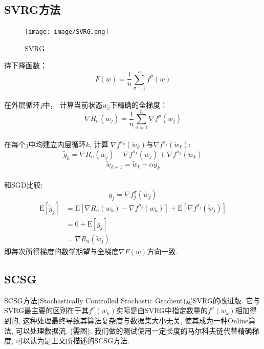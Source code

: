 \documentclass{article}
\newcommand{\E}[1]{\mathrm{E}\left[#1\right]}
\begin{document}
\subsection*{SVRG方法}
\begin{figure}[h]
    \centering
    \texttt{[image: image/SVRG.png]}
    \caption{SVRG}
    \label{fig:SVRG}
\end{figure}
待下降函数：
\begin{equation}
    F(w)=\frac{1}{n}\sum_{\sigma=1}^n f^\sigma(w)
\end{equation}
\\
在外层循环$j$中， 计算当前状态$w_j$下精确的全梯度：
\begin{equation}
    \nabla R_n(w_j)=\frac1n\sum_{\sigma=1}^n \nabla f^\sigma(w_j)
\end{equation}
\\
在每个$j$中均建立内层循环$k$, 计算 $\nabla f^{\sigma_k}(\tilde{w}_k)$与$\nabla f^{\sigma_j}(\tilde{w}_k)$:
\begin{equation}
    \tilde{g}_k = \nabla R_n(w_j)
        -\nabla f^{\sigma_k}(w_j)
        +\nabla f^{\sigma_k}(\tilde{w}_k)
\end{equation}
\begin{equation}
    \tilde{w}_{k+1}=\tilde{w}_{k}-\alpha \tilde{g}_k    
\end{equation}
\\
和SGD比较: 
\begin{equation}
    g_j = \nabla f^\sigma_j(\tilde{w}_j)
\end{equation}
\begin{align*}
    \E{ \tilde{g}_j} &= \E{\nabla R_n(w_k)
        - \nabla f^{\sigma_j}(w_k)}
        + \E{\nabla f^{\sigma_j}(\tilde{w}_j)}\\
        &= 0 + \E{g_j}\\
        &= \nabla R_n(\tilde{w}_j)
\end{align*}
即每次所得梯度的数学期望与全梯度$\nabla F(w)$方向一致.

\subsection*{SCSG}
SCSG方法(Stochastically Controlled Stochastic Gradient)是SVRG的改进版. 它与SVRG最主要的区别在于其$f^\sigma(w_k)$实际是由SVRG中指定数量的$f^\sigma(w_k)$相加得到的, 
这种处理最终导致其算法复杂度与数据集大小无关, 使其成为一种Online算法, 可以处理数据流.
(需图). 我们做的测试使用一定长度的马尔科夫链代替精确梯度, 可以认为是上文所描述的SCSG方法.
\end{document}
